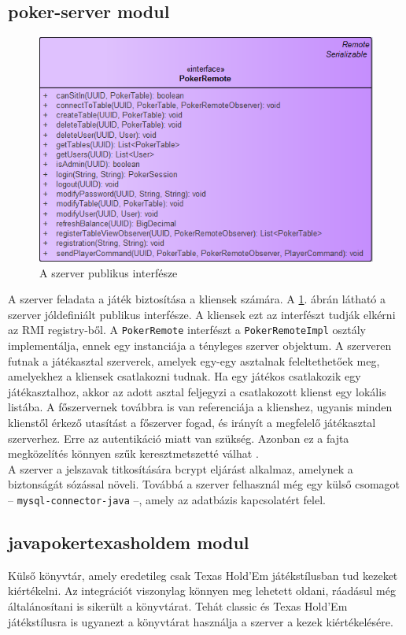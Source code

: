 \subsection{poker-server modul}
\begin{figure}[h!]
  \caption{A szerver publikus interfésze}
  \label{fig:server_public}
  \centering
    \includegraphics[width=\textwidth]{developer-documentation/images/server_remote.png}
\end{figure}
A szerver feladata a játék biztosítása a kliensek számára. A \ref{fig:server_public}. ábrán látható a szerver jóldefiniált publikus interfésze. A kliensek ezt az interfészt tudják elkérni az RMI registry-ből. A \texttt{PokerRemote} interfészt a \texttt{PokerRemoteImpl} osztály implementálja, ennek egy instanciája a tényleges szerver objektum. A szerveren futnak a játékasztal szerverek, amelyek egy-egy asztalnak feleltethetőek meg, amelyekhez a kliensek csatlakozni tudnak. Ha egy játékos csatlakozik egy játékasztalhoz, akkor az adott asztal feljegyzi a csatlakozott klienst egy lokális listába. A főszervernek továbbra is van referenciája a klienshez, ugyanis minden klienstől érkező utasítást a főszerver fogad, és irányít a megfelelő játékasztal szerverhez. Erre az autentikáció miatt van szükség. Azonban ez a fajta megközelítés könnyen szűk keresztmetszetté válhat \cite{bottleneck}. \\
A szerver a jelszavak titkosítására bcrypt \cite{bcrypt} eljárást alkalmaz, amelynek a biztonságát sózással növeli. Továbbá a szerver felhasznál még egy külső csomagot -- \texttt{mysql-connector-java} --, amely az adatbázis kapcsolatért felel.

\subsection{javapokertexasholdem modul}
Külső könyvtár, amely eredetileg csak Texas Hold'Em játékstílusban tud kezeket kiértékelni. Az integrációt viszonylag könnyen meg lehetett oldani, ráadásul még általánosítani is sikerült a könyvtárat. Tehát classic és Texas Hold'Em játékstílusra is ugyanezt a könyvtárat használja a szerver a kezek kiértékelésére.

